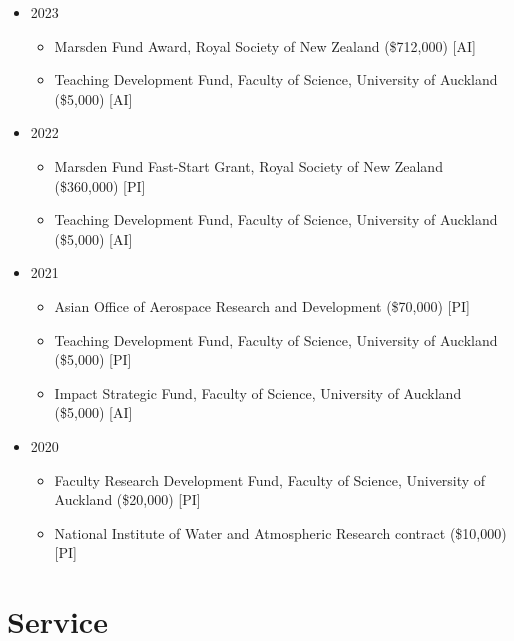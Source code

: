 \documentclass[10pt,a4paper]{moderncv}
\begin{document}
\vspace{6pt}
\begin{itemize}
  \item 2023
  \begin{itemize}
  \item Marsden Fund Award, Royal Society of New Zealand (\$712,000) [AI]
  \item Teaching Development Fund, Faculty of Science, University of Auckland (\$5,000) [AI]
  \end{itemize}
\item 2022
  \begin{itemize}
  \item Marsden Fund Fast-Start Grant, Royal Society of New Zealand (\$360,000) [PI]
  \item Teaching Development Fund, Faculty of Science, University of Auckland (\$5,000) [AI]
  \end{itemize}
\item 2021
  \begin{itemize}
  \item Asian Office of Aerospace Research and Development (\$70,000) [PI]
  \item Teaching Development Fund, Faculty of Science, University of Auckland (\$5,000) [PI]
  \item Impact Strategic Fund, Faculty of Science, University of Auckland (\$5,000) [AI]
  \end{itemize}
\item 2020
  \begin{itemize}
  \item Faculty Research Development Fund, Faculty of Science, University of Auckland (\$20,000) [PI]
  \item National Institute of Water and Atmospheric Research contract (\$10,000) [PI]
  \end{itemize}
\end{itemize}

\newpage


\section{Service}
\vspace{6pt}
\end{document}

